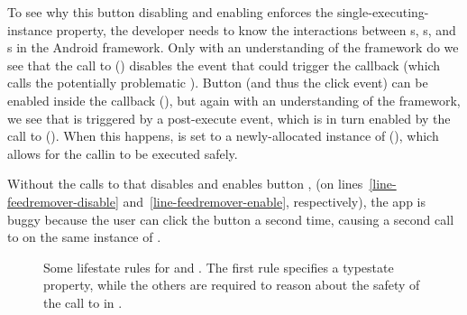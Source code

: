 \documentclass[10pt,reprint,nocopyrightspace,numbers]{sigplanconf}
\begin{document}
To see why this button disabling and enabling enforces the single-executing-instance property, the developer needs to know the interactions between s, s, and s in the Android framework.
%
Only with an understanding of the framework do we see that the call to  () disables the event that could trigger the  callback (which calls the potentially problematic ).
Button  (and thus the click event) can be enabled inside the callback  (), but again with an understanding of the framework, we see that  is triggered by a post-execute event, which is in turn enabled by the call to  (). When this happens,  is set to a newly-allocated instance of  (), which allows for the  callin to be executed safely. 
%

Without the calls to  that disables and enables button ,
(on lines~\ref{line-feedremover-disable} and~\ref{line-feedremover-enable}, respectively),
the app is buggy because the user can click the button a second time, causing a second call to  on the same instance of .

\begin{figure}
\caption{Some lifestate rules for  and .
The first rule specifies a typestate property, while the others are required to reason about the safety of the call to  in .}
\label{fig:feedremover-rules}
\end{figure}
\end{document}
